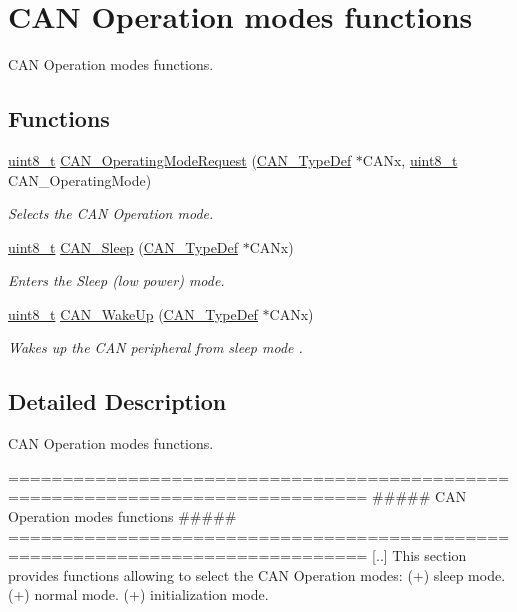 \hypertarget{group___c_a_n___group4}{\section{C\-A\-N Operation modes functions}
\label{group___c_a_n___group4}
}


C\-A\-N Operation modes functions.  


\subsection*{Functions}
\begin{DoxyCompactItemize}
\item 
\hyperlink{stdint_8h_aba7bc1797add20fe3efdf37ced1182c5}{uint8\-\_\-t} \hyperlink{group___c_a_n___group4_gab2a3630e9e3024114eb117d14e514208}{C\-A\-N\-\_\-\-Operating\-Mode\-Request} (\hyperlink{struct_c_a_n___type_def}{C\-A\-N\-\_\-\-Type\-Def} $\ast$C\-A\-Nx, \hyperlink{stdint_8h_aba7bc1797add20fe3efdf37ced1182c5}{uint8\-\_\-t} C\-A\-N\-\_\-\-Operating\-Mode)
\begin{DoxyCompactList}\small\item\em Selects the C\-A\-N Operation mode. \end{DoxyCompactList}\item 
\hyperlink{stdint_8h_aba7bc1797add20fe3efdf37ced1182c5}{uint8\-\_\-t} \hyperlink{group___c_a_n___group4_ga640215e38765759d7eceb8a039046667}{C\-A\-N\-\_\-\-Sleep} (\hyperlink{struct_c_a_n___type_def}{C\-A\-N\-\_\-\-Type\-Def} $\ast$C\-A\-Nx)
\begin{DoxyCompactList}\small\item\em Enters the Sleep (low power) mode. \end{DoxyCompactList}\item 
\hyperlink{stdint_8h_aba7bc1797add20fe3efdf37ced1182c5}{uint8\-\_\-t} \hyperlink{group___c_a_n___group4_ga78cdfbf1884b9e33c552bcbca15bed10}{C\-A\-N\-\_\-\-Wake\-Up} (\hyperlink{struct_c_a_n___type_def}{C\-A\-N\-\_\-\-Type\-Def} $\ast$C\-A\-Nx)
\begin{DoxyCompactList}\small\item\em Wakes up the C\-A\-N peripheral from sleep mode . \end{DoxyCompactList}\end{DoxyCompactItemize}


\subsection{Detailed Description}
C\-A\-N Operation modes functions. \begin{DoxyVerb} ===============================================================================
                    ##### CAN Operation modes functions #####
 ===============================================================================  
    [..] This section provides functions allowing to select the CAN Operation modes:
         (+) sleep mode.
         (+) normal mode. 
         (+) initialization mode.\end{DoxyVerb}


